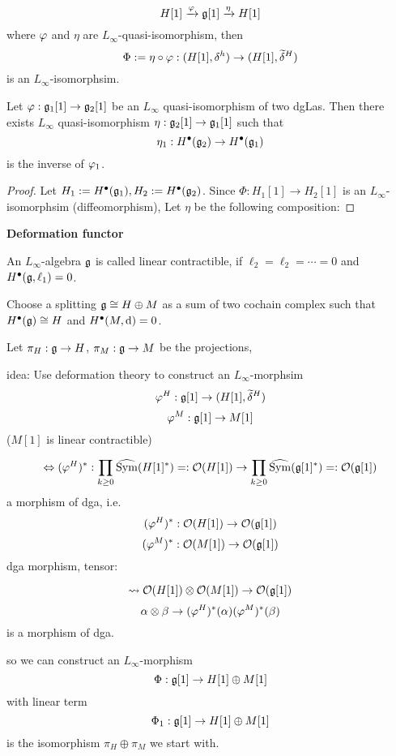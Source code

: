 \begin{rem}
$$H[1]\xrightarrow{\varphi}\mathfrak{g}[1]\xrightarrow{\eta}H[1]$$
where $\varphi$ and $\eta$ are $L_\infty$-quasi-isomorphism, then
$$\Phi:=\eta\circ\varphi:
(H[1],\delta^h)\to (H[1],\widetilde{\delta}^H)$$
is an $L_\infty$-isomorphsim.
\end{rem}

\begin{prop}
Let $\varphi:\mathfrak{g}_1[1]\to\mathfrak{g}_2[1]$
be an $L_\infty$ quasi-isomorphism of two dgLas.
Then there exists $L_\infty$ quasi-isomorphism
$\eta:\mathfrak{g}_2[1]\to\mathfrak{g}_1[1]$ such that
$$\eta_1:H^{\bullet}(\mathfrak{g}_2)\to H^{\bullet}(\mathfrak{g}_1)$$
is the inverse of $\varphi_1$.
\end{prop}

\begin{proof}
Let $H_1:=H^{\bullet}(\mathfrak{g}_1), H_2:=H^{\bullet}(\mathfrak{g}_2)$.
Since $\Phi:H_1[1]\to H_2[1]$ is an $L_\infty$-isomorphsim
(diffeomorphism), Let $\eta$ be the following composition:
\end{proof}


\textbf{Deformation functor}
\begin{definition}
An $L_\infty$-algebra $\mathfrak{g}$ is called linear contractible,
if $\ell_2=\ell_2=\cdots=0$ and $H^{\bullet}(\mathfrak{g},\ell_1)=0$.
\end{definition}

Choose a splitting $\mathfrak{g}\cong H\oplus M$ as a
sum of two cochain complex such that
$H^{\bullet}(\mathfrak{g})\cong H$ and $H^{\bullet}(M,\mathrm{d})=0$.

Let $\pi_H:\mathfrak{g}\to H$, $\pi_M:\mathfrak{g}\to M$ be the projections,

idea: Use deformation theory to construct an $L_\infty$-morphsim
$$\varphi^H:\mathfrak{g}[1]\to(H[1],\widetilde{\delta}^H)$$
$$\varphi^M:\mathfrak{g}[1]\to M[1]$$
($M[1]$ is linear contractible)

$$\Leftrightarrow
(\varphi^H)^*:\prod_{k\geq 0}\widehat{\operatorname{Sym}}(H[1]^*)=:\mathcal{O}(H[1])
\to \prod_{k\geq 0}\widehat{\operatorname{Sym}}(\mathfrak{g}[1]^*)=:\mathcal{O}(\mathfrak{g}[1])
$$
a morphism of dga,
i.e.
$$(\varphi^H)^*:\mathcal{O}(H[1])\to\mathcal{O}(\mathfrak{g}[1])$$
$$(\varphi^M)^*:\mathcal{O}(M[1])\to\mathcal{O}(\mathfrak{g}[1])$$
dga morphism, tensor:

$$\rightsquigarrow
\mathcal{O}(H[1])\otimes \mathcal{O}(M[1])
\to
\mathcal{O}(\mathfrak{g}[1])
$$
$$\alpha\otimes\beta\to(\varphi^H)^*(\alpha)(\varphi^M)^*(\beta)$$
is a morphism of dga.

so we can construct an $L_\infty$-morphism
$$\Phi:\mathfrak{g}[1]\to H[1]\oplus M[1]$$
with linear term
$$\Phi_1:\mathfrak{g}[1]\to H[1]\oplus M[1]$$
is the isomorphism $\pi_H\oplus\pi_M$
we start with.

